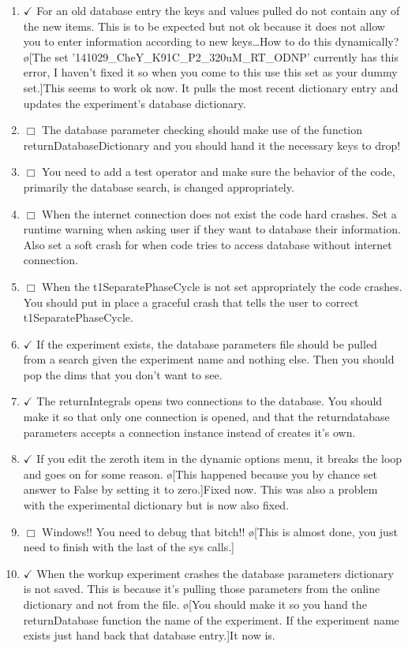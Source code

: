 \documentclass[10pt]{book}
\begin{document}
\begin{enumerate}
    \item $\checkmark$ For an old database entry the keys and values pulled do not contain any of the new items. This is to be expected but not ok because it does not allow you to enter information according to new keys\ldots How to do this dynamically? \o[The set '141029_CheY_K91C_P2_320uM_RT_ODNP' currently has this error, I haven't fixed it so when you come to this use this set as your dummy set.]{This seems to work ok now. It pulls the most recent dictionary entry and updates the experiment's database dictionary.}
    \item $\Box$ The database parameter checking should make use of the function returnDatabaseDictionary and you should hand it the necessary keys to drop!
    \item $\Box$ You need to add a test operator and make sure the behavior of the code, primarily the database search, is changed appropriately.
    \item $\Box$ When the internet connection does not exist the code hard crashes. Set a runtime warning when asking user if they want to database their information. Also set a soft crash for when code tries to access database without internet connection.
    \item $\Box$ When the t1SeparatePhaseCycle is not set appropriately the code crashes. You should put in place a graceful crash that tells the user to correct t1SeparatePhaseCycle.
    \item $\checkmark$ If the experiment exists, the database parameters file should be pulled from a search given the experiment name and nothing else. Then you should pop the dims that you don't want to see. 
    \item $\checkmark$ The returnIntegrals opens two connections to the database. You should make it so that only one connection is opened, and that the returndatabase parameters accepts a connection instance instead of creates it's own.
    \item $\checkmark$ If you edit the zeroth item in the dynamic options menu, it breaks the loop and goes on for some reason. \o[This happened because you by chance set answer to False by setting it to zero.]{Fixed now. This was also a problem with the experimental dictionary but is now also fixed.} 
    \item $\Box$ Windows!! You need to debug that bitch!! \o[This is almost done, you just need to finish with the last of the sys calls.]{}
    \item $\checkmark$ When the workup experiment crashes the database parameters dictionary is not saved. This is because it's pulling those parameters from the online dictionary and not from the file. \o[You should make it so you hand the returnDatabase function the name of the experiment. If the experiment name exists just hand back that database entry.]{It now is.}

\end{enumerate}
\end{document}
